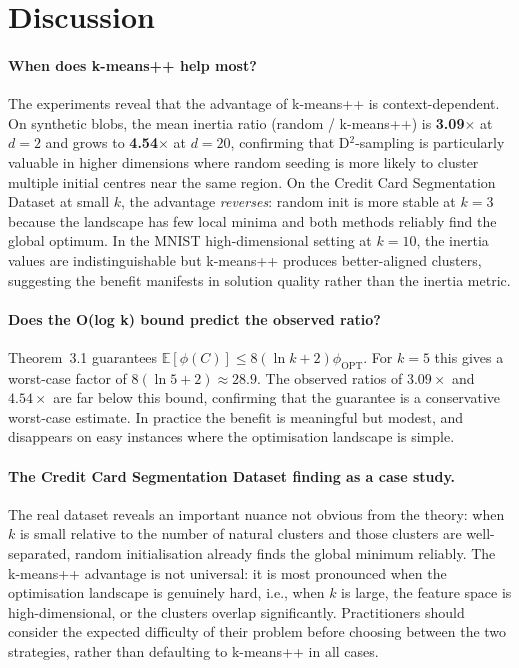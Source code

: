 \documentclass[11pt,a4paper]{article}
\newcommand{\OPT}{\phi_{\mathrm{OPT}}}
\newcommand{\phiC}{\phi(C)}
\newcommand{\E}{\mathbb{E}}
\begin{document}
\section{Discussion}

\paragraph{When does k-means++ help most?}
The experiments reveal that the advantage of k-means++ is context-dependent.
On synthetic blobs, the mean inertia ratio (random / k-means++) is
\textbf{3.09$\times$} at $d=2$ and grows to \textbf{4.54$\times$} at $d=20$,
confirming that D$^2$-sampling is particularly valuable in higher dimensions
where random seeding is more likely to cluster multiple initial centres near
the same region.
On the Credit Card Segmentation Dataset at small $k$, the advantage \emph{reverses}: random init is
more stable at $k=3$ because the landscape has few local minima and both
methods reliably find the global optimum.
In the MNIST high-dimensional setting at $k=10$, the inertia values are
indistinguishable but k-means++ produces better-aligned clusters, suggesting
the benefit manifests in solution quality rather than the inertia metric.

\paragraph{Does the O(log k) bound predict the observed ratio?}
Theorem~3.1 guarantees $\E[\phiC] \leq 8(\ln k + 2)\OPT$.
For $k=5$ this gives a worst-case factor of $8(\ln 5 + 2) \approx 28.9$.
The observed ratios of $3.09\times$ and $4.54\times$ are far below this bound,
confirming that the guarantee is a conservative worst-case estimate.
In practice the benefit is meaningful but modest, and disappears on easy
instances where the optimisation landscape is simple.

\paragraph{The Credit Card Segmentation Dataset finding as a case study.}
The real dataset reveals an important nuance not obvious from the theory:
when $k$ is small relative to the number of natural clusters and those clusters
are well-separated, random initialisation already finds the global minimum
reliably.
The k-means++ advantage is not universal: it is most pronounced when the
optimisation landscape is genuinely hard, i.e., when $k$ is large, the feature
space is high-dimensional, or the clusters overlap significantly.
Practitioners should consider the expected difficulty of their problem before
choosing between the two strategies, rather than defaulting to k-means++ in
all cases.
\end{document}
